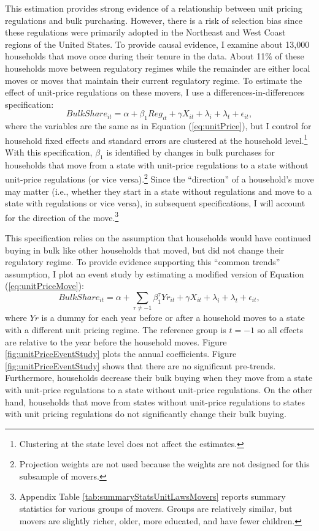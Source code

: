 \documentclass[AER]{AEA_mal}
\begin{document}
This estimation provides strong evidence of a relationship between unit pricing regulations and bulk purchasing. However, there is a risk of selection bias since these regulations were primarily adopted in the Northeast and West Coast regions of the United States. To provide causal evidence, I examine about 13,000 households that move once during their tenure in the data. About 11\% of these households move between regulatory regimes while the remainder are either local moves or moves that maintain their current regulatory regime. To estimate the effect of unit-price regulations on these movers, I use a differences-in-differences specification:
\begin{equation}
\label{eq:unitPriceMove}
BulkShare_{it} = \alpha + \beta_1 Reg_{it} + \gamma X_{it} + \lambda_i + \lambda_t + \epsilon_{it},
\end{equation}
where the variables are the same as in Equation (\ref{eq:unitPrice}), but I control for household fixed effects and standard errors are clustered at the household level.\footnote{Clustering at the state level does not affect the estimates.} With this specification, $\beta_1$ is identified by changes in bulk purchases for households that move from a state with unit-price regulations to a state without unit-price regulations (or vice versa).\footnote{Projection weights are not used because the weights are not designed for this subsample of movers.} Since the ``direction'' of a household's move may matter (i.e., whether they start in a state without regulations and move to a state with regulations or vice versa), in subsequent specifications, I will account for the direction of the move.\footnote{Appendix Table \ref{tab:summaryStatsUnitLawsMovers} reports summary statistics for various groups of movers. Groups are relatively similar, but movers are slightly richer, older, more educated, and have fewer children.}

This specification relies on the assumption that households would have continued buying in bulk like other households that moved, but did not change their regulatory regime. To provide evidence supporting this ``common trends'' assumption, I plot an event study by estimating a modified version of Equation (\ref{eq:unitPriceMove}):
\begin{equation}
\label{eq:unitPriceEventStudy}
BulkShare_{it} = \alpha + \sum_{\tau \neq -1} \beta_1^\tau Yr_{it} + \gamma X_{it} + \lambda_i + \lambda_t + \epsilon_{it},
\end{equation}
where $Yr$ is a dummy for each year before or after a household moves to a state with a different unit pricing regime. The reference group is $t = -1$ so all effects are relative to the year before the household moves. Figure \ref{fig:unitPriceEventStudy} plots the annual coefficients. Figure \ref{fig:unitPriceEventStudy} shows that there are no significant pre-trends. Furthermore, households decrease their bulk buying when they move from a state with unit-price regulations to a state without unit-price regulations. On the other hand, households that move from states without unit-price regulations to states with unit pricing regulations do not significantly change their bulk buying.
\end{document}

